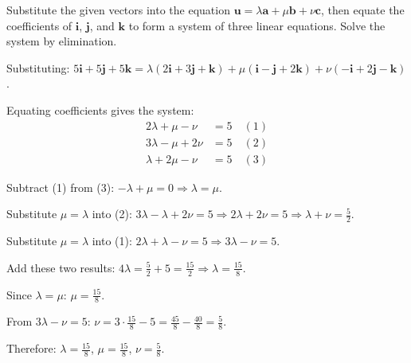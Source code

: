\begin{hint}
Substitute the given vectors into the equation $\mathbf{u} = \lambda\mathbf{a} + \mu\mathbf{b} + \nu\mathbf{c}$, then equate the coefficients of $\mathbf{i}$, $\mathbf{j}$, and $\mathbf{k}$ to form a system of three linear equations. Solve the system by elimination.
\end{hint}

\begin{solution}[Sketch]
Substituting: $5\mathbf{i} + 5\mathbf{j} + 5\mathbf{k} = \lambda(2\mathbf{i} + 3\mathbf{j} + \mathbf{k}) + \mu(\mathbf{i} - \mathbf{j} + 2\mathbf{k}) + \nu(-\mathbf{i} + 2\mathbf{j} - \mathbf{k})$.

Equating coefficients gives the system:
\begin{align*}
2\lambda + \mu - \nu &= 5 \quad (1) \\
3\lambda - \mu + 2\nu &= 5 \quad (2) \\
\lambda + 2\mu - \nu &= 5 \quad (3)
\end{align*}

Subtract (1) from (3): $-\lambda + \mu = 0 \Rightarrow \lambda = \mu$.

Substitute $\mu = \lambda$ into (2): $3\lambda - \lambda + 2\nu = 5 \Rightarrow 2\lambda + 2\nu = 5 \Rightarrow \lambda + \nu = \frac{5}{2}$.

Substitute $\mu = \lambda$ into (1): $2\lambda + \lambda - \nu = 5 \Rightarrow 3\lambda - \nu = 5$.

Add these two results: $4\lambda = \frac{5}{2} + 5 = \frac{15}{2} \Rightarrow \lambda = \frac{15}{8}$.

Since $\lambda = \mu$: $\mu = \frac{15}{8}$.

From $3\lambda - \nu = 5$: $\nu = 3 \cdot \frac{15}{8} - 5 = \frac{45}{8} - \frac{40}{8} = \frac{5}{8}$.

Therefore: $\lambda = \frac{15}{8}$, $\mu = \frac{15}{8}$, $\nu = \frac{5}{8}$.
\end{solution}

